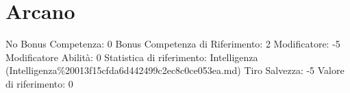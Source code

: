 \section{Arcano}\label{arcano}

\begin{description}
\tightlist
\item[Tags: ABI]
No Bonus Competenza: 0 Bonus Competenza di Riferimento: 2 Modificatore:
-5 Modificatore Abilità: 0 Statistica di riferimento: Intelligenza
(Intelligenza\%20013f15cfda6d442499c2ec8c0ce053ea.md) Tiro Salvezza: -5
Valore di riferimento: 0
\end{description}

